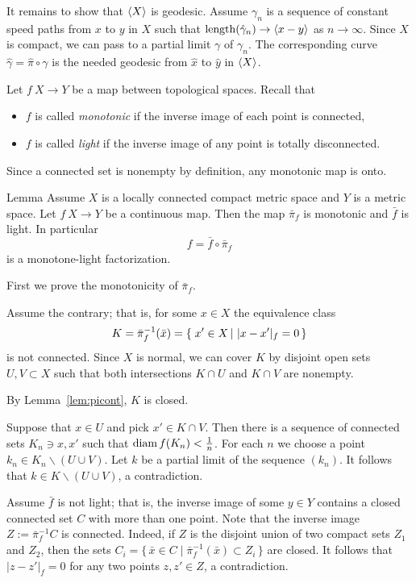 \documentclass{article}
\begin{document}
It remains to show that $\langle X\rangle$ is geodesic.
Assume $\gamma_n$ is a sequence of constant speed paths from $x$ to $y$ in $X$
such that $\mathop{\rm length}\nolimits(\hat\gamma_n)\to \langle x-y\rangle$ as $n\to\infty$.
Since $X$ is compact, we can pass to a partial limit $\gamma$ of  $\gamma_n$.
The corresponding curve $\hat\gamma=\hat \pi\circ\gamma$ is the needed geodesic from $\hat x$ to $\hat y$ in $\langle X\rangle$.
\qeds

Let $f\:X\to Y$ be a map between topological spaces.
Recall that 
\begin{itemize}
\item $f$ is called \emph{monotonic} if the inverse image of each point is connected,
 \item $f$ is called \emph{light} if the inverse image of any point is totally disconnected.
\end{itemize}
Since a connected set is nonempty by definition, any monotonic map is onto.

\begin{thm}{Lemma}\label{cor:fiberconnected}
Assume $X$ is a locally connected compact metric space and $Y$ is a metric space.
Let $f\:X\to Y$ be a continuous map.
Then the map $\bar \pi_f$ is monotonic and $\bar f$ is light.
In particular 
\[f=\bar f\circ\bar\pi_f\]
is a monotone-light factorization. 
\end{thm}

First we prove the monotonicity of $\bar\pi_f$.

Assume the contrary;
that is, for some $x\in X$ the equivalence class 
\[K=\bar\pi_f^{-1}(\bar x)=\set{x'\in X}{|x-x'|_f=0}\]
is not connected. Since $X$ is normal, we
can cover $K$ by disjoint open sets $U,V\subset X$ such that both intersections
$K\cap U$ and $K\cap V$ are nonempty.

By Lemma~\ref{lem:picont}, $K$ is closed.

Suppose that $x\in U$ and pick $x'\in K\cap V$.
Then there is a sequence of connected sets $K_n\ni x,x'$ such that $\mathop{\rm diam}\nolimits f(K_n)<\tfrac1n$.
For each $n$ we choose a point $k_n\in K_n\backslash (U\cup V)$.
Let $k$ be a partial limit of the sequence $(k_n)$.
It follows that $k\in K\backslash (U\cup V)$, a contradiction. 

Assume $\bar f$ is not light;
that is, the inverse image of some $y\in Y$ contains a closed connected set $C$ with more than one point.  
Note that the inverse image $Z:=\bar\pi_f^{-1}C$ is connected. 
Indeed, if $Z$ is the disjoint union of two compact sets $Z_1$ and $Z_2$, then the sets 
$C_i=\{\,\bar x\in C\mid\bar\pi_f^{-1}(\bar x)\subset Z_i\,\}$ are closed.
It follows that $|z-z'|_f=0$ for any two points $z,z'\in Z$, a contradiction.
\qeds
\end{document}
